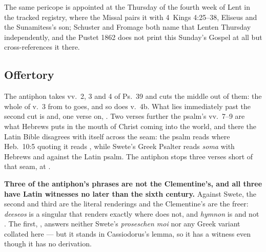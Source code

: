 
The same pericope is appointed at the Thursday of the fourth week of Lent in the
tracked registry, where the Missal pairs it with 4~Kings 4:25--38, Eliseus and the
Sunamitess's son; Schuster and Fromage both name that Lenten Thursday
independently, and the Pustet 1862 does not print this Sunday's Gospel at all but
cross-references it there.

\subsection*{Offertory }

The antiphon takes vv.~2, 3 and 4 of Ps.~39 and cuts the middle out of them: the
whole of v.~3 from  to  goes, and so does v.~4b. What lies immediately past the second cut is
 and, one verse on,
. Two verses further the
psalm's vv.~7--9 are what Hebrews puts in the mouth of Christ coming into the
world, and there the Latin Bible disagrees with itself across the seam: the psalm
reads  where Heb.\ 10:5 quoting it reads
, while Swete's Greek Psalter reads \emph{soma}
with Hebrews and against the Latin psalm. The antiphon stops three verses short of
that seam, at .

\textbf{Three of the antiphon's phrases are not the Clementine's, and all three
have Latin witnesses no later than the sixth century.} Against Swete, the second and third are the
literal renderings and the Clementine's are the freer: \emph{deeseos} is a
singular that  renders exactly where 
does not, and \emph{hymnon} is  and not . The first,
, answers neither Swete's \emph{proseschen moi} nor any Greek
variant collated here --- but it stands in Cassiodorus's lemma, so it has a witness
even though it has no derivation.

